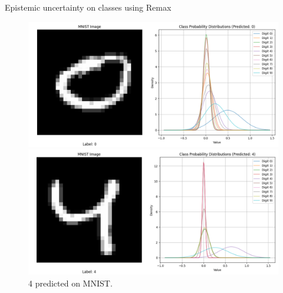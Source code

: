 \documentclass[final]{beamer}
\begin{document}
\begin{frame}[t]
\begin{columns}
\begin{column}[T]{.31\textwidth}
\begin{block}{Epistemic uncertainty on classes using Remax}
\begin{figure}[h]
    \centering
    \begin{minipage}[b]{0.5\textwidth}
        \includegraphics[width=\textwidth]{0}
        \caption*{0 predicted on MNIST.}
    \end{minipage}\hfill
    \begin{minipage}[b]{0.5\textwidth}
        \includegraphics[width=\textwidth]{4}
        \caption*{4 predicted on MNIST.}
    \end{minipage}
\end{figure}


\end{block}
\end{column}
\end{columns}
\end{frame}
\end{document}
